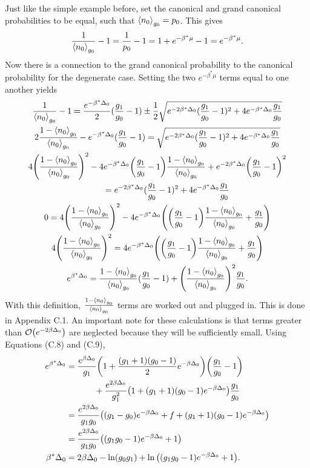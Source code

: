 Just like the simple example before, set the canonical and grand canonical probabilities to be equal, such that $\left<{n_0}\right>_{g_0}=p_0$. This gives 
\begin{align}
    \frac{1}{\left<{n_0}\right>_{g_0}}-1=\frac{1}{p_0}-1=1+e^{-\beta^*\mu}-1=e^{-\beta^*\mu} .
\end{align}
Now there is a connection to the grand canonical probability to the canonical probability for the degenerate case. Setting the two $e^{-\beta^*\mu}$ terms equal to one another yields
\begin{gather}
    \frac{1}{\left<{n_0}\right>_{g_0}}-1=\frac{e^{-\beta^*\Delta_0}}{2}(\frac{g_1}{g_0}-1)\pm \frac{1}{2}\sqrt{e^{-2\beta^*\Delta_0} (\frac{g_1}{g_0}-1)^2+ 4e^{-\beta^*\Delta_0}\frac{g_1}{g_0}}\nonumber\\
    2\frac{1-\left<{n_0}\right>_{g_0}}{\left<{n_0}\right>_{g_0}}-e^{-\beta^*\Delta_0}(\frac{g_1}{g_0}-1)=\sqrt{e^{-2\beta^*\Delta_0} (\frac{g_1}{g_0}-1)^2+ 4e^{-\beta^*\Delta_0}\frac{g_1}{g_0}}\nonumber\\
    4\qty(\frac{1-\left<{n_0}\right>_{g_0}}{\left<{n_0}\right>_{g_0}})^2-4e^{-\beta^*\Delta_0}\qty(\frac{g_1}{g_0}-1) \frac{1-\left<{n_0}\right>_{g_0}}{\left<{n_0}\right>_{g_0}}+e^{-2\beta^*\Delta_0} \qty(\frac{g_1}{g_0}-1)^2\nonumber\\ 
    \ \ \ \ \ \ \  =e^{-2\beta^*\Delta_0} (\frac{g_1}{g_0}-1)^2+ 4e^{-\beta^*\Delta_0}\frac{g_1}{g_0} \nonumber\nonumber\\
    0=4\qty(\frac{1-\left<{n_0}\right>_{g_0}}{\left<{n_0}\right>_{g_0}})^2- 4e^{-\beta^*\Delta_0}\qty(\qty(\frac{g_1}{g_0}-1)\frac{1-\left<{n_0}\right>_{g_0}}{\left<{n_0}\right>_{g_0}}+\frac{g_1}{g_0})\nonumber\\
    4\qty(\frac{1-\left<{n_0}\right>_{g_0}}{\left<{n_0}\right>_{g_0}})^2=4e^{-\beta^*\Delta_0}\qty(\qty(\frac{g_1}{g_0}-1)\frac{1-\left<{n_0}\right>_{g_0}}{\left<{n_0}\right>_{g_0}}+\frac{g_1}{g_0})\nonumber\\
    e^{\beta^* \Delta_0}=\frac{1-\left<{n_0}\right>_{g_0}}{\left<{n_0}\right>_{g_0}}(\frac{g_1}{g_0}-1)+\qty(\frac{1-\left<{n_0}\right>_{g_0}}{\left<{n_0}\right>_{g_0}})^2\frac{g_1}{g_0}.
\end{gather}
With this definition, $\frac{1-\left<{n_0}\right>_{g_0}}{\left<{n_0}\right>_{g_0}}$ terms are worked out and plugged in. This is done in Appendix C.1. An important note for these calculations is that terms greater than $\mathcal{O}\qty(e^{-2\beta \Delta_0})$ are neglected because they will be sufficiently small. Using Equations (C.8) and (C.9),
\begin{align}
    e^{\beta^* \Delta_0}&=\frac{e^{\beta\Delta_0}}{g_1}\qty(1+\frac{(g_1+1)(g_0-1)}{2}e^{-\beta\Delta_0})\qty(\frac{g_1}{g_0}-1)\nonumber\\
    &\ \ \ \ \ \ \ \ \ \ +\frac{e^{2\beta\Delta_0}}{g_1^2}\qty(1+(g_1+1)(g_0-1)e^{-\beta\Delta_0})\frac{g_1}{g_0}\nonumber\\
    &=\frac{e^{2\beta\Delta_0}}{g_1g_0}\qty((g_1-g_0)e^{-\beta\Delta_0}+f+(g_1+1)(g_0-1)e^{-\beta\Delta_0})\nonumber\\
    &=\frac{e^{2\beta\Delta_0}}{g_1g_0}\qty((g_1g_0-1)e^{-\beta\Delta_0}+1)\\
    \beta^*\Delta_0&=2\beta\Delta_0-\ln(g_0g_1)+\ln\qty((g_1g_0-1)e^{-\beta\Delta_0}+1).
\end{align}
